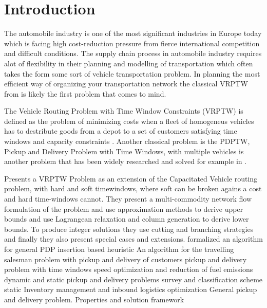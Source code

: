 \documentclass[../main.tex]{subfiles}
\begin{document}
 
\chapter{Introduction}
The automobile industry is one of the most significant industries in Europe today which is facing high cost-reduction pressure from fierce international competition and difficult conditions.\cite{4flowWeb}
The supply chain process in automobile industry requires alot of flexibility in their planning and modelling of transportation which often takes the form some sort of vehicle transportation problem.
In planning the most efficient way of organizing your transportation network the classical VRPTW from is likely the first problem that comes to mind.

\cite{parragh08}
The Vehicle Routing Problem with Time Window Constraints (VRPTW) is defined as the problem of minimizing costs when a fleet of homogeneus vehicles has to destribute goods from a depot to a set of customers satisfying time windows and capacity constraints \cite{cordeau00}. 
Another classical problem is the PDPTW, Pickup and Delivery Problem with Time Windows, with multiple vehicles is another problem that has been widely researched and solved for example in \cite{nanry00}. 
\par

\cite{cordeau00} Presents a VRPTW Problem as an extension of the Capacitated Vehicle routing problem, with hard and soft timewindows, where soft can be broken agains a cost and hard time-windows cannot.
They present a multi-commodity network flow formulation of the problem and use approximation methods to derive upper bounds and use Lagrangean relaxation and column generation to derive lower bounds. 
To produce integer solutions they use cutting and branching strategies and finally they also present special cases and extensions. 
\cite{solomon87} formalized an algorithm for general PDP
\cite{lu06} insertion based heuristic
\cite{kalantari85} An algorithm for the travelling salesman problem with pickup and delivery of customers
\cite{dumas91} pickup and delivery problem with time windows
\cite{fagerholt10} speed optimization and reduction of fuel emissions
\cite{berbeglia10} dynamic and static pickup and delivery problems survey and classification scheme 
\cite{berbeglia07} static
\cite{zhou13} Inventory management and inbound logistics optimization
\cite{savelsbergh95} General pickup and delivery problem.
\cite{dror89} Properties and solution framework
\end{document}
